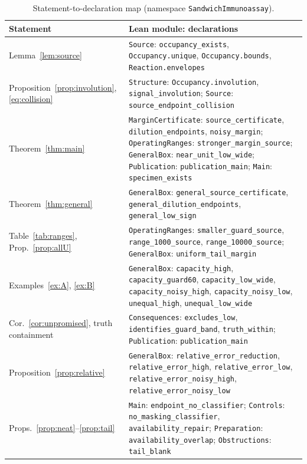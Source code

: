 \documentclass[11pt]{article}
\theoremstyle{plain}
\theoremstyle{definition}
\numberwithin{equation}{section}
\begin{document}
\begin{table}[t]
\centering\small
\caption{Statement-to-declaration map (namespace \texttt{SandwichImmunoassay}).}
\label{tab:formal}
\begin{tabular}{@{}>{\raggedright\arraybackslash}p{.33\linewidth}>{\raggedright\arraybackslash}p{.62\linewidth}@{}}\toprule
Statement & Lean module: declarations\\\midrule
Lemma~\ref{lem:source} & \texttt{Source}: \texttt{occupancy\_exists}, \texttt{Occupancy.unique}, \texttt{Occupancy.bounds}, \texttt{Reaction.envelopes}\\
Proposition~\ref{prop:involution}, \eqref{eq:collision} & \texttt{Structure}: \texttt{Occupancy.involution}, \texttt{signal\_involution}; \texttt{Source}: \texttt{source\_endpoint\_collision}\\
Theorem~\ref{thm:main} & \texttt{MarginCertificate}: \texttt{source\_certificate}, \texttt{dilution\_endpoints}, \texttt{noisy\_margin}; \texttt{OperatingRanges}: \texttt{stronger\_margin\_source}; \texttt{GeneralBox}: \texttt{near\_unit\_low\_wide}; \texttt{Publication}: \texttt{publication\_main}; \texttt{Main}: \texttt{specimen\_exists}\\
Theorem~\ref{thm:general} & \texttt{GeneralBox}: \texttt{general\_source\_certificate}, \texttt{general\_dilution\_endpoints}, \texttt{general\_low\_sign}\\
Table~\ref{tab:ranges}, Prop.~\ref{prop:allU} & \texttt{OperatingRanges}: \texttt{smaller\_guard\_source}, \texttt{range\_1000\_source}, \texttt{range\_10000\_source}; \texttt{GeneralBox}: \texttt{uniform\_tail\_margin}\\
Examples~\ref{ex:A}, \ref{ex:B} & \texttt{GeneralBox}: \texttt{capacity\_high}, \texttt{capacity\_guard60}, \texttt{capacity\_low\_wide}, \texttt{capacity\_noisy\_high}, \texttt{capacity\_noisy\_low}, \texttt{unequal\_high}, \texttt{unequal\_low\_wide}\\
Cor.~\ref{cor:unpromised}, truth containment & \texttt{Consequences}: \texttt{excludes\_low}, \texttt{identifies\_guard\_band}, \texttt{truth\_within}; \texttt{Publication}: \texttt{publication\_main}\\
Proposition~\ref{prop:relative} & \texttt{GeneralBox}: \texttt{relative\_error\_reduction}, \texttt{relative\_error\_high}, \texttt{relative\_error\_low}, \texttt{relative\_error\_noisy\_high}, \texttt{relative\_error\_noisy\_low}\\
Props.~\ref{prop:neat}--\ref{prop:tail} & \texttt{Main}: \texttt{endpoint\_no\_classifier}; \texttt{Controls}: \texttt{no\_masking\_classifier}, \texttt{availability\_repair}; \texttt{Preparation}: \texttt{availability\_overlap}; \texttt{Obstructions}: \texttt{tail\_blank}\\

\end{tabular}
\end{table}
\end{document}
